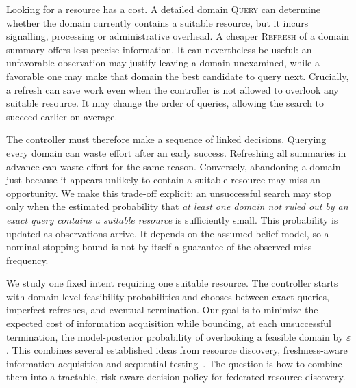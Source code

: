 \documentclass[conference]{IEEEtran}
\newcommand{\QUERY}{\textsc{Query}}
\newcommand{\REFRESH}{\textsc{Refresh}}
\begin{document}
Looking for a resource has a cost. A detailed domain \QUERY{} can determine whether the domain currently contains a suitable resource, but it incurs signalling, processing or administrative overhead. A cheaper \REFRESH{} of a domain summary offers less precise information. It can nevertheless be useful: an unfavorable observation may justify leaving a domain unexamined, while a favorable one may make that domain the best candidate to query next. Crucially, a refresh can save work even when the controller is not allowed to overlook any suitable resource. It may change the order of queries, allowing the search to succeed earlier on average.

The controller must therefore make a sequence of linked decisions. Querying every domain can waste effort after an early success. Refreshing all summaries in advance can waste effort for the same reason. Conversely, abandoning a domain just because it appears unlikely to contain a suitable resource may miss an opportunity. We make this trade-off explicit: an unsuccessful search may stop only when the estimated probability that \emph{at least one domain not ruled out by an exact query contains a suitable resource} is sufficiently small. This probability is updated as observations arrive. It depends on the assumed belief model, so a nominal stopping bound is not by itself a guarantee of the observed miss frequency.

We study one fixed intent requiring one suitable resource. The controller starts with domain-level feasibility probabilities and chooses between exact queries, imperfect refreshes, and eventual termination. Our goal is to minimize the expected cost of information acquisition while bounding, at each unsuccessful termination, the model-posterior probability of overlooking a feasible domain by $\varepsilon$. This combines several established ideas from resource discovery, freshness-aware information acquisition and sequential testing~\cite{murturi2022metadata,chiariotti2022qaoi,gkenosis2022sbfe,wei2017imperfect}. The question is how to combine them into a tractable, risk-aware decision policy for federated resource discovery.
\end{document}
